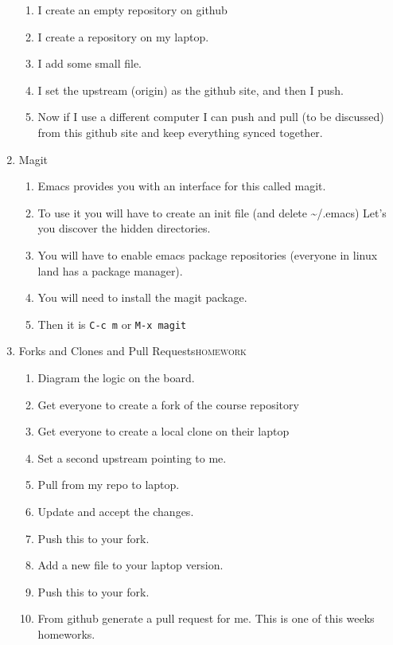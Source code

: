 \documentclass{article}
\begin{document}
\begin{enumerate}
\begin{enumerate}
\item I create an empty repository on github
\item I create a repository on my laptop.
\item I add some small file.
\item I set the upstream (origin) as the github site, and then I push.
\item Now if I use a different computer I can push and pull (to be discussed) from this github site and keep everything synced together.
\end{enumerate}
\item Magit
\label{sec:org890743f}
\begin{enumerate}
\item Emacs provides you with an interface for this called magit.
\item To use it you will have to create an init file (and delete \textasciitilde{}/.emacs)
Let's you discover the hidden directories.
\item You will have to enable emacs package repositories (everyone in linux land has a package manager).
\item You will need to install the magit package.
\item Then it is \texttt{C-c m} or \texttt{M-x magit}
\end{enumerate}
\item Forks and Clones and Pull Requests\hfill{}\textsc{homework}
\label{sec:org1e1d8c8}
\begin{enumerate}
\item Diagram the logic on the board.
\item Get everyone to create a fork of the course repository
\item Get everyone to create a local clone on their laptop
\item Set a second upstream pointing to me.
\item Pull from my repo to laptop.
\item Update and accept the changes.
\item Push this to your fork.
\item Add a new file to your laptop version.
\item Push this to your fork.
\item From github generate a pull request for me. This is one of this weeks homeworks.
\end{enumerate}
\end{enumerate}
\end{document}
